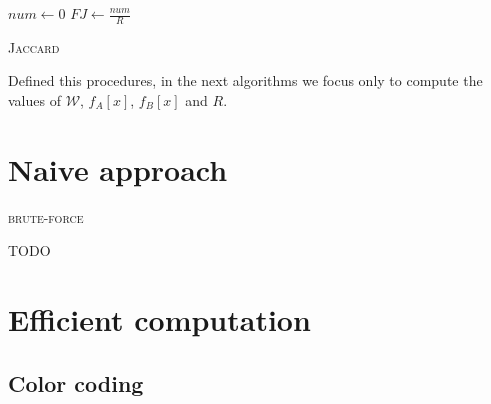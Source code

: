 \begin{algorithm}[h]
	\small
	\DontPrintSemicolon
	\BlankLine
	$num \gets 0$\;
	$FJ \gets \frac{num}{R}$\;
	\caption{\textsc{Jaccard}}
	\label{alg:jaccard}
\end{algorithm}

Defined this procedures, in the next algorithms we focus only to compute the values of $\mathcal{W}$, $f_{A}[x]$, $f_{B}[x]$ and $R$.

\clearpage 

\section{Naive approach}

    \begin{algorithm}[h]
    
    \small
    \DontPrintSemicolon
    \Output{\ }
    
    \BlankLine
    
    

    
    \caption{\textsc{brute-force}}
    
    \label{alg:brute-force}
    \end{algorithm}

	TODO 
\clearpage

\section{Efficient computation}


\subsection*{Color coding}


